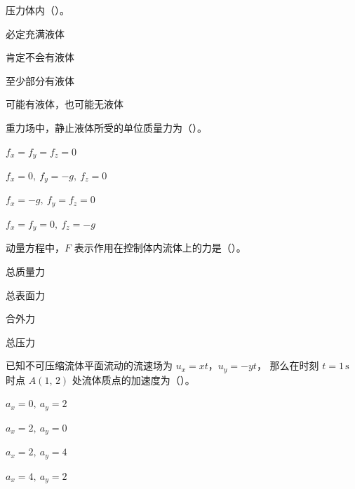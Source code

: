 \begin{ti}
  \item 压力体内（\quad）。\hfill{}
  \begin{choices}
    \item 必定充满液体
    \item 肯定不会有液体
    \item 至少部分有液体
    \item 可能有液体，也可能无液体
  \end{choices}

  \item 重力场中，静止液体所受的单位质量力为（\quad）。\hfill{}
  \begin{choices}
    \item $f_x=f_y=f_z=0$
    \item $f_x=0,\ f_y=-g,\ f_z=0$
    \item $f_x=-g,\ f_y=f_z=0$
    \item $f_x=f_y=0,\ f_z=-g$
  \end{choices}

  \item 动量方程中，\(F\) 表示作用在控制体内流体上的力是（\quad）。\hfill{}
  \begin{choices}
    \item 总质量力
    \item 总表面力
    \item 合外力
    \item 总压力
  \end{choices}

  \item 已知不可压缩流体平面流动的流速场为 \(u_x=xt\)，\(u_y=-yt\)，
  那么在时刻 \(t=1\,\mathrm{s}\) 时点 \(A(1,\,2)\) 处流体质点的加速度为（\quad）。
  \hfill{}
  \begin{choices}
    \item $a_x=0,\ a_y=2$
    \item $a_x=2,\ a_y=0$
    \item $a_x=2,\ a_y=4$
    \item $a_x=4,\ a_y=2$
  \end{choices}


\end{ti}
